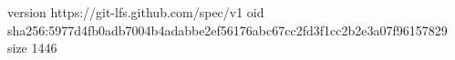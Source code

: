 version https://git-lfs.github.com/spec/v1
oid sha256:5977d4fb0adb7004b4adabbe2ef56176abc67cc2fd3f1cc2b2e3a07f96157829
size 1446
